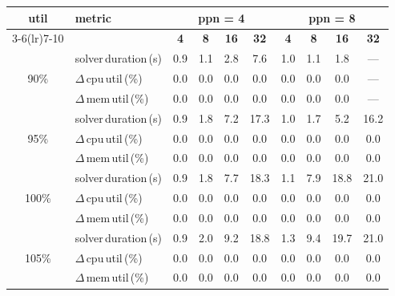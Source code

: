 \begin{tabular}{@{}c l *{8}{c}@{}}
\toprule
\multirow{2}{*}{\textbf{util}} & \multirow{2}{*}{\textbf{metric}} &\multicolumn{4}{c}{\textbf{ppn = 4}} & \multicolumn{4}{c}{\textbf{ppn = 8}}\\
\cmidrule(lr){3-6}\cmidrule(lr){7-10}
 &  & \textbf{4} & \textbf{8} & \textbf{16} & \textbf{32} & \textbf{4} & \textbf{8} & \textbf{16} & \textbf{32}\\
\midrule
\multirow{3}{*}{90\%}
& solver\,duration\,(s) & 0.9 & 1.1 & 2.8 & 7.6 & 1.0 & 1.1 & 1.8 & \multicolumn{1}{c}{—} \\
& $\Delta$\,cpu\,util\,(\%) & 0.0 & 0.0 & 0.0 & 0.0 & 0.0 & 0.0 & 0.0 & \multicolumn{1}{c}{—} \\
& $\Delta$\,mem\,util\,(\%) & 0.0 & 0.0 & 0.0 & 0.0 & 0.0 & 0.0 & 0.0 & \multicolumn{1}{c}{—} \\
\midrule
\multirow{3}{*}{95\%}
& solver\,duration\,(s) & 0.9 & 1.8 & 7.2 & 17.3 & 1.0 & 1.7 & 5.2 & 16.2 \\
& $\Delta$\,cpu\,util\,(\%) & 0.0 & 0.0 & 0.0 & 0.0 & 0.0 & 0.0 & 0.0 & 0.0 \\
& $\Delta$\,mem\,util\,(\%) & 0.0 & 0.0 & 0.0 & 0.0 & 0.0 & 0.0 & 0.0 & 0.0 \\
\midrule
\multirow{3}{*}{100\%}
& solver\,duration\,(s) & 0.9 & 1.8 & 7.7 & 18.3 & 1.1 & 7.9 & 18.8 & 21.0 \\
& $\Delta$\,cpu\,util\,(\%) & 0.0 & 0.0 & 0.0 & 0.0 & 0.0 & 0.0 & 0.0 & 0.0 \\
& $\Delta$\,mem\,util\,(\%) & 0.0 & 0.0 & 0.0 & 0.0 & 0.0 & 0.0 & 0.0 & 0.0 \\
\midrule
\multirow{3}{*}{105\%}
& solver\,duration\,(s) & 0.9 & 2.0 & 9.2 & 18.8 & 1.3 & 9.4 & 19.7 & 21.0 \\
& $\Delta$\,cpu\,util\,(\%) & 0.0 & 0.0 & 0.0 & 0.0 & 0.0 & 0.0 & 0.0 & 0.0 \\
& $\Delta$\,mem\,util\,(\%) & 0.0 & 0.0 & 0.0 & 0.0 & 0.0 & 0.0 & 0.0 & 0.0 \\
\bottomrule
\end{tabular}
